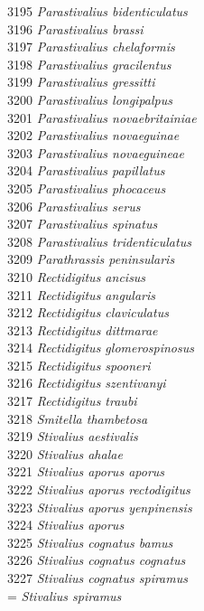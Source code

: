 \documentclass[
]{article}
\begin{document}
3195 \emph{Parastivalius bidenticulatus}\\
3196 \emph{Parastivalius brassi}\\
3197 \emph{Parastivalius chelaformis}\\
3198 \emph{Parastivalius gracilentus}\\
3199 \emph{Parastivalius gressitti}\\
3200 \emph{Parastivalius longipalpus}\\
3201 \emph{Parastivalius novaebritainiae}\\
3202 \emph{Parastivalius novaeguinae}\\
3203 \emph{Parastivalius novaeguineae}\\
3204 \emph{Parastivalius papillatus}\\
3205 \emph{Parastivalius phocaceus}\\
3206 \emph{Parastivalius serus}\\
3207 \emph{Parastivalius spinatus}\\
3208 \emph{Parastivalius tridenticulatus}\\
3209 \emph{Parathrassis peninsularis}\\
3210 \emph{Rectidigitus ancisus}\\
3211 \emph{Rectidigitus angularis}\\
3212 \emph{Rectidigitus claviculatus}\\
3213 \emph{Rectidigitus dittmarae}\\
3214 \emph{Rectidigitus glomerospinosus}\\
3215 \emph{Rectidigitus spooneri}\\
3216 \emph{Rectidigitus szentivanyi}\\
3217 \emph{Rectidigitus traubi}\\
3218 \emph{Smitella thambetosa}\\
3219 \emph{Stivalius aestivalis}\\
3220 \emph{Stivalius ahalae}\\
3221 \emph{Stivalius aporus aporus}\\
3222 \emph{Stivalius aporus rectodigitus}\\
3223 \emph{Stivalius aporus yenpinensis}\\
3224 \emph{Stivalius aporus}\\
3225 \emph{Stivalius cognatus bamus}\\
3226 \emph{Stivalius cognatus cognatus}\\
3227 \emph{Stivalius cognatus spiramus}\\
= \emph{Stivalius spiramus}\\
\end{document}
